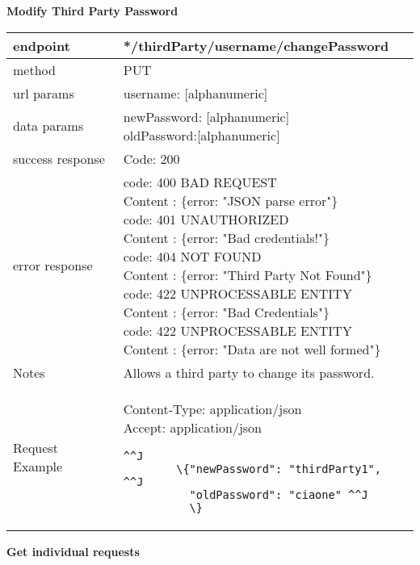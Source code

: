 \textbf{Modify Third Party Password}\\

\begin{tabularx}{\linewidth}{| l| l }
	\hline
	endpoint & */thirdParty/{username}/changePassword \\
	\hline
	method & PUT \\
	\hline
	url params & 
	\parbox{0.7\textwidth}{
		\bigskip
		username: [alphanumeric]
		\bigskip
	}\\
	\hline
	data params & 
	\parbox{0.7\textwidth}{
		\bigskip
		newPassword: [alphanumeric]\\
		oldPassword:[alphanumeric]
		\bigskip
	} \\
	\hline
	success response &
	\parbox{0.7\textwidth}{
		\bigskip
		Code: 200
		\bigskip
	} \\
	\hline
	error response &
	\parbox{0.7\textwidth}{
		\bigskip
		code: 400 BAD REQUEST \\
		Content : \{error: "JSON parse error"\}\\
		code: 401 UNAUTHORIZED \\
		Content : \{error: "Bad credentials!"\}\\
		code: 404 NOT FOUND \\
		Content : \{error: "Third Party Not Found"\}\\
		code: 422 UNPROCESSABLE ENTITY\\
		Content : \{error: "Bad Credentials"\}\\
		code: 422 UNPROCESSABLE ENTITY\\
		Content : \{error: "Data are not well formed"\}
		\bigskip
	} \\
	\hline
	Notes & \parbox{0.7\textwidth}{
		\bigskip
		Allows a third party to change its password.
		\bigskip
	} \\
	\hline
	Request Example & 
		\parbox{0.8\textwidth}{
		\bigskip
		Content-Type: application/json \\
		Accept: application/json \\
		\bigskip
		\begin{lstlisting}^^J
		\{"newPassword": "thirdParty1", ^^J
		  "oldPassword": "ciaone" ^^J
		  \}
		\end{lstlisting}
	} \\
		\hline
\end{tabularx}
\newpage
\textbf{Get individual requests} \\


